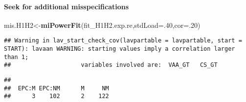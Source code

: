 \documentclass[
]{article}
\newenvironment{Shaded}{\begin{snugshade}}{\end{snugshade}}
\newcommand{\CommentTok}[1]{\textcolor[rgb]{0.56,0.35,0.01}{\textit{#1}}}
\newcommand{\DataTypeTok}[1]{\textcolor[rgb]{0.13,0.29,0.53}{#1}}
\newcommand{\DecValTok}[1]{\textcolor[rgb]{0.00,0.00,0.81}{#1}}
\newcommand{\KeywordTok}[1]{\textcolor[rgb]{0.13,0.29,0.53}{\textbf{#1}}}
\newcommand{\NormalTok}[1]{#1}
\newcommand{\OperatorTok}[1]{\textcolor[rgb]{0.81,0.36,0.00}{\textbf{#1}}}
\newcommand{\StringTok}[1]{\textcolor[rgb]{0.31,0.60,0.02}{#1}}
\begin{document}
\newpage

\hypertarget{seek-for-additional-misspecifications}{%
\paragraph{Seek for additional
misspecifications}\label{seek-for-additional-misspecifications}}

\begin{Shaded}
\begin{Highlighting}[]
\NormalTok{mis.H1H2<-}\KeywordTok{miPowerFit}\NormalTok{(fit_H1H2.exp.re,}\DataTypeTok{stdLoad=}\NormalTok{.}\DecValTok{40}\NormalTok{,}\DataTypeTok{cor=}\NormalTok{.}\DecValTok{20}\NormalTok{)}
\end{Highlighting}
\end{Shaded}

\begin{verbatim}
## Warning in lav_start_check_cov(lavpartable = lavpartable, start = START): lavaan WARNING: starting values imply a correlation larger than 1;
##                    variables involved are:  VAA_GT   CS_GT
\end{verbatim}

\begin{Shaded}
\end{Shaded}

\begin{verbatim}
## 
##  EPC:M EPC:NM      M     NM 
##      3    102      2    122
\end{verbatim}
\end{document}
